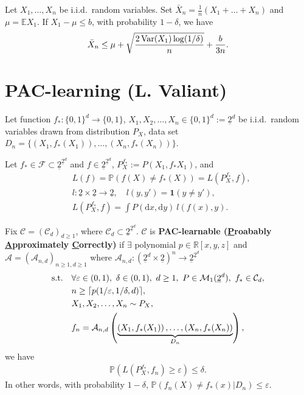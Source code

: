 \documentclass[twoside]{article}
\begin{document}
\begin{theorem}
    Let $X_1,\ldots, X_n$ be i.i.d.\ random variables. Set $\bar{X}_n=\frac{1}{n}(X_1+\ldots+X_n)$ and $\mu = \mathbb{E}X_1$.  If $X_1-\mu \le b$, with probability $1-\delta$, we have
    \begin{align*}
        \bar{X}_n \le \mu + \sqrt{ \frac{ 2 \operatorname{Var}(X_1) \log(1/\delta) }{n} } + \frac{b}{3n}.
    \end{align*}
    
\end{theorem}

\section{PAC-learning (L. Valiant)}

Let function  $f_*: \{0,1\}^d \rightarrow \{0,1\}$, $ X_1, X_2, \ldots, X_n \in \{0,1\}^d := \underline{2}^d$ be i.i.d.\ random variables drawn from distribution $P_X$, data set $D_n=\{ \left( X_1, f_*(X_1)\right), \ldots, \left( X_n, f_*(X_n)\right) \}$.

Let $f_* \in \mathcal{F} \subset \underline{2}^{ \underline{2}^d } $ and $f \in \underline{2}^{ \underline{2}^d } $, $P_X^{f_*}:= P(X_1, f_*{X_1})$, and 
\begin{align*}
    & L(f) = \mathbb{P} \left( f(X) \ne f_*(X) \right) = L( P_X^{f_*} ,f ),\\
    & l: \underline{2} \times \underline{2} \rightarrow \underline{2}, \quad l(y,y') = \mathbf{1}(y\ne y'),\\
    & L( P_X^{f_*},f  ) = \int P(\mathrm{d}x, \mathrm{d}y) \ l( f(x),y ).
\end{align*}

\begin{definition}
    Fix $\mathcal{C} = (\mathcal{C}_d)_{d\ge 1}$, where $\mathcal{C}_d \subset \underline{2}^{\underline{2}^d }$. $\mathcal{C}$ is \textbf{PAC-learnable (\underline{P}roabably \underline{A}pproximately \underline{C}orrectly)} if $\exists$ polynomial $p\in \mathbb{R}[x,y,z]$ and $\mathcal{A}= (\mathcal{A}_{n,d})_{n\ge 1, d\ge 1}$ where $\mathcal{A}_{n,d}:\left( \underline{2}^d\times \underline{2} \right)^n \rightarrow  \underline{2}^{ \underline{2}^d }$
    \begin{align*}
        \text{s.t.\quad }
        & \forall  \varepsilon \in (0,1), \ \delta \in(0,1), \ d\ge 1, \ P \in \mathcal{M}_1(\underline{2}^d),\  f_* \in \mathcal{C}_d,\\
        & n\ge \lceil p( 1/\varepsilon, 1/\delta, d )\rceil,\\
        & X_1,X_2,\ldots,X_n\sim P_X,\\
        & f_n = \mathcal{A}_{n,d} \left( \underbrace{\left( X_1, f_*(X_1)\right), \ldots, \left( X_n, f_*(X_n)\right)}_{D_n} \right),
    \end{align*}
    we have
    \begin{align*}
        \mathbb{P}\left( L\left( P_X^{f_*},f_n \right) \ge \varepsilon  \right) \le \delta.
    \end{align*}
    In other words, with probability $1-\delta$, $\mathbb{P} \left( f_n(X) \ne f_*(x) | D_n \right) \le \varepsilon$.
\end{definition} 
\end{document}
